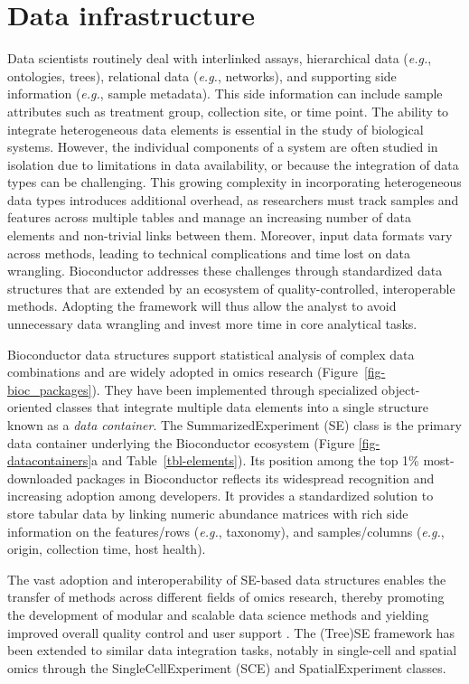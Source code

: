 \documentclass[
  sn-nature,
]{sn-jnl}
\begin{document}
\section{Data infrastructure}\label{sec-infra}

Data scientists routinely deal with interlinked assays, hierarchical
data (\emph{e.g.}, ontologies, trees), relational data (\emph{e.g.},
networks), and supporting side information (\emph{e.g.}, sample
metadata). This side information can include sample attributes such as
treatment group, collection site, or time point. The ability to
integrate heterogeneous data elements is essential in the study of
biological systems. However, the individual components of a system are
often studied in isolation due to limitations in data availability, or
because the integration of data types can be challenging. This growing
complexity in incorporating heterogeneous data types introduces
additional overhead, as researchers must track samples and features
across multiple tables and manage an increasing number of data elements
and non-trivial links between them. Moreover, input data formats vary
across methods, leading to technical complications and time lost on data
wrangling. Bioconductor addresses these challenges through standardized
data structures that are extended by an ecosystem of quality-controlled,
interoperable methods. Adopting the framework will thus allow the
analyst to avoid unnecessary data wrangling and invest more time in core
analytical tasks.

Bioconductor data structures support statistical analysis of complex
data combinations \citep{huber2015} and are widely adopted in omics
research (Figure~\ref{fig-bioc_packages}). They have been implemented
through specialized object-oriented classes that integrate multiple data
elements into a single structure known as a \emph{data container}. The
SummarizedExperiment (SE) class \citep{huber2015} is the primary data
container underlying the Bioconductor ecosystem (Figure
\ref{fig-datacontainers}a and Table~\ref{tbl-elements}). Its position
among the top 1\% most-downloaded packages in Bioconductor reflects its
widespread recognition and increasing adoption among developers. It
provides a standardized solution to store tabular data by linking
numeric abundance matrices with rich side information on the
features/rows (\emph{e.g.}, taxonomy), and samples/columns (\emph{e.g.},
origin, collection time, host health).

The vast adoption and interoperability of SE-based data structures
enables the transfer of methods across different fields of omics
research, thereby promoting the development of modular and scalable data
science methods and yielding improved overall quality control and user
support \citep{drnevich2025}. The (Tree)SE framework has been extended
to similar data integration tasks, notably in single-cell and spatial
omics through the SingleCellExperiment (SCE) \citep{amezquita2020} and
SpatialExperiment \citep{righelli2022} classes.
\end{document}
